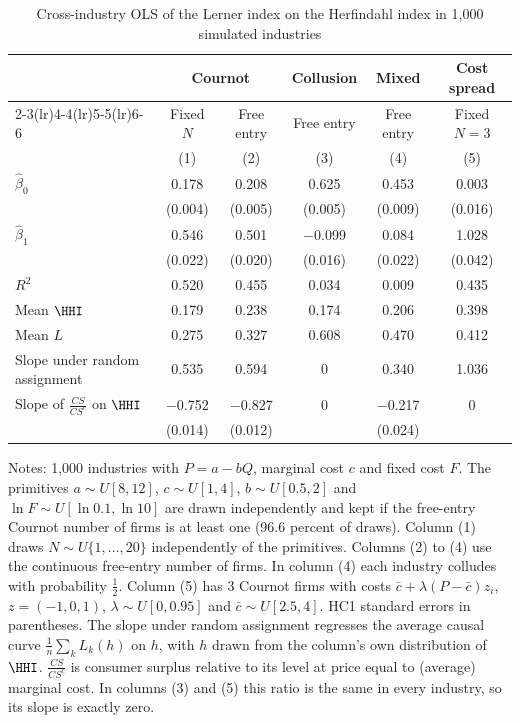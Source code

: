 \begin{table}[htbp]
\centering\small
\caption{Cross-industry OLS of the Lerner index on the Herfindahl index in 1,000 simulated industries}
\label{tab:01-montecarlo}
\begin{threeparttable}
\begin{tabular}{lccccc}
\toprule
 & \multicolumn{2}{c}{Cournot} & Collusion & Mixed & Cost spread \\
\cmidrule(lr){2-3}\cmidrule(lr){4-4}\cmidrule(lr){5-5}\cmidrule(lr){6-6}
 & Fixed $N$ & Free entry & Free entry & Free entry & Fixed $N = 3$ \\
 & (1) & (2) & (3) & (4) & (5) \\
\midrule
$\hat\beta_0$ & 0.178 & 0.208 & 0.625 & 0.453 & 0.003 \\
 & (0.004) & (0.005) & (0.005) & (0.009) & (0.016) \\
$\hat\beta_1$ & 0.546 & 0.501 & $-$0.099 & 0.084 & 1.028 \\
 & (0.022) & (0.020) & (0.016) & (0.022) & (0.042) \\
$R^2$ & 0.520 & 0.455 & 0.034 & 0.009 & 0.435 \\
Mean $\HHI$ & 0.179 & 0.238 & 0.174 & 0.206 & 0.398 \\
Mean $L$ & 0.275 & 0.327 & 0.608 & 0.470 & 0.412 \\
\midrule
Slope under random assignment & 0.535 & 0.594 & 0 & 0.340 & 1.036 \\
Slope of $\frac{CS}{CS^c}$ on $\HHI$ & $-$0.752 & $-$0.827 & 0 & $-$0.217 & 0 \\
 & (0.014) & (0.012) &  & (0.024) &  \\
\bottomrule
\end{tabular}
\begin{tablenotes}\footnotesize
\item Notes: 1,000 industries with $P = a - bQ$, marginal cost $c$ and fixed cost $F$. The primitives $a \sim U[8, 12]$, $c \sim U[1, 4]$, $b \sim U[0.5, 2]$ and $\ln F \sim U[\ln 0.1, \ln 10]$ are drawn independently and kept if the free-entry Cournot number of firms is at least one (96.6 percent of draws). Column (1) draws $N \sim U\{1, \dots, 20\}$ independently of the primitives. Columns (2) to (4) use the continuous free-entry number of firms. In column (4) each industry colludes with probability $\frac{1}{2}$. Column (5) has 3 Cournot firms with costs $\bar c + \lambda (P - \bar c) z_i$, $z = (-1, 0, 1)$, $\lambda \sim U[0, 0.95]$ and $\bar c \sim U[2.5, 4]$. HC1 standard errors in parentheses. The slope under random assignment regresses the average causal curve $\frac{1}{n}\sum_k L_k(h)$ on $h$, with $h$ drawn from the column's own distribution of $\HHI$. $\frac{CS}{CS^c}$ is consumer surplus relative to its level at price equal to (average) marginal cost. In columns (3) and (5) this ratio is the same in every industry, so its slope is exactly zero.
\end{tablenotes}
\end{threeparttable}
\end{table}
